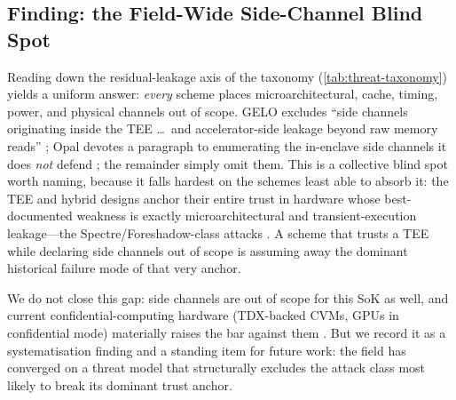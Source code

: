 \subsection{Finding: the Field-Wide Side-Channel Blind Spot}
\label{ssec:sidechannel}

Reading down the residual-leakage axis of the taxonomy (\cref{tab:threat-taxonomy})
yields a uniform answer: \emph{every} scheme places microarchitectural, cache, timing,
power, and physical channels out of scope. GELO excludes ``side channels
originating inside the TEE \dots\ and accelerator-side leakage beyond raw memory
reads'' \citep{belikov_gelo}; Opal devotes a paragraph to enumerating the
in-enclave side channels it does \emph{not} defend \citep{kaviani_opal}; the
remainder simply omit them. This is a collective blind spot worth naming,
because it falls hardest on the schemes least able to absorb it: the TEE and
hybrid designs anchor their entire trust in hardware whose best-documented
weakness is exactly microarchitectural and transient-execution leakage---the
Spectre/Foreshadow-class attacks . A scheme that trusts a TEE while declaring
side channels out of scope is assuming away the dominant historical failure
mode of that very anchor.

We do not close this gap: side channels are out of scope for this SoK as
well, and current confidential-computing hardware
(TDX-backed CVMs, GPUs in confidential mode) materially raises the bar against
them \citep{kaviani_opal}. But we record it as a systematisation finding and a
standing item for future work: the field has converged on a threat model that
structurally excludes the attack class most likely to break its dominant trust
anchor.
